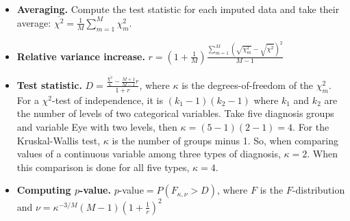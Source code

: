 \documentclass[11pt,a5paper,twoside]{book}
\begin{document}
{\begin{itemize}
	\item \textbf{Averaging.} Compute the test statistic for each imputed data and take their average: $\overline{\chi^2} = \frac{1}{M} \sum_{m=1}^M \chi^2_m$.
	\item \textbf{Relative variance increase.} $r=\left(1+\frac{1}{M} \right) \frac{\sum_{m=1}^M (\sqrt{\chi^2_m} - \sqrt{\overline{\chi^2}})^2}{M-1}$
	\item \textbf{Test statistic.} $D=\frac{\frac{\overline{\chi^2}}{\kappa} - \frac{M+1}{M-1}r}{1+r}$, where $\kappa$ is the degrees-of-freedom of the $\chi^2_m$. For a $\chi^2$-test of independence, it is $(k_1-1)(k_2-1)$ where $k_1$ and $k_2$ are the number of levels of two categorical variables. Take five diagnosis groups and variable \textsf{Eye} with two levels, then $\kappa=(5-1)(2-1)=4$. For the Kruskal-Wallis test, $\kappa$ is the number of groups minus 1. So, when comparing values of a continuous variable among three types of diagnosis, $\kappa=2$. When this comparison is done for all five types, $\kappa=4$. 
	\item \textbf{Computing $p$-value.} $p$-value$=P(F_{\kappa,\nu} > D)$, where $F$ is the $F$-distribution and $\nu=\kappa^{-3/M} (M-1) \left(1+\frac{1}{r}\right)^2$
\end{itemize}

\setcounter{equation}{0}
}
\end{document}
